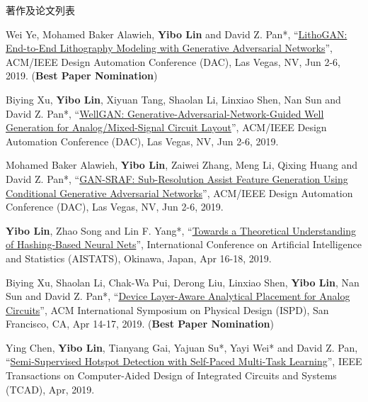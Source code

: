\begin{rSection}{著作及论文列表}
\begin{description}[font=\normalfont, rightmargin=2em]
\item[{[C41]}]{
        Wei Ye, Mohamed Baker Alawieh, \textbf{Yibo Lin} and David Z. Pan*, 
    ``\href{https://doi.org/10.1145/3316781.3317852}{LithoGAN: End-to-End Lithography Modeling with Generative Adversarial Networks}'', 
    ACM/IEEE Design Automation Conference (DAC), Las Vegas, NV, Jun 2-6, 2019.
    (\textbf{Best Paper Nomination})
}
            

\item[{[C40]}]{
        Biying Xu, \textbf{Yibo Lin}, Xiyuan Tang, Shaolan Li, Linxiao Shen, Nan Sun and David Z. Pan*, 
    ``\href{https://doi.org/10.1145/3316781.3317930}{WellGAN: Generative-Adversarial-Network-Guided Well Generation for Analog/Mixed-Signal Circuit Layout}'', 
    ACM/IEEE Design Automation Conference (DAC), Las Vegas, NV, Jun 2-6, 2019.
    
}
            

\item[{[C39]}]{
        Mohamed Baker Alawieh, \textbf{Yibo Lin}, Zaiwei Zhang, Meng Li, Qixing Huang and David Z. Pan*, 
    ``\href{https://doi.org/10.1145/3316781.3317832}{GAN-SRAF: Sub-Resolution Assist Feature Generation Using Conditional Generative Adversarial Networks}'', 
    ACM/IEEE Design Automation Conference (DAC), Las Vegas, NV, Jun 2-6, 2019.
    
}
            

\item[{[C38]}]{
        \textbf{Yibo Lin}, Zhao Song and Lin F. Yang*, 
    ``\href{https://arxiv.org/abs/1812.10244}{Towards a Theoretical Understanding of Hashing-Based Neural Nets}'', 
    International Conference on Artificial Intelligence and Statistics (AISTATS), Okinawa, Japan, Apr 16-18, 2019.
    
}
            

\item[{[C37]}]{
        Biying Xu, Shaolan Li, Chak-Wa Pui, Derong Liu, Linxiao Shen, \textbf{Yibo Lin}, Nan Sun and David Z. Pan*, 
    ``\href{https://doi.org/10.1145/3299902.3309751}{Device Layer-Aware Analytical Placement for Analog Circuits}'', 
    ACM International Symposium on Physical Design (ISPD), San Francisco, CA, Apr 14-17, 2019.
    (\textbf{Best Paper Nomination})
}
            

\item[{[J36]}]{
        Ying Chen, \textbf{Yibo Lin}, Tianyang Gai, Yajuan Su*, Yayi Wei* and David Z. Pan, 
    ``\href{https://doi.org/10.1109/TCAD.2019.2912948}{Semi-Supervised Hotspot Detection with Self-Paced Multi-Task Learning}'', 
    IEEE Transactions on Computer-Aided Design of Integrated Circuits and Systems (TCAD), Apr, 2019.
    
}
\end{description}
\end{rSection}
